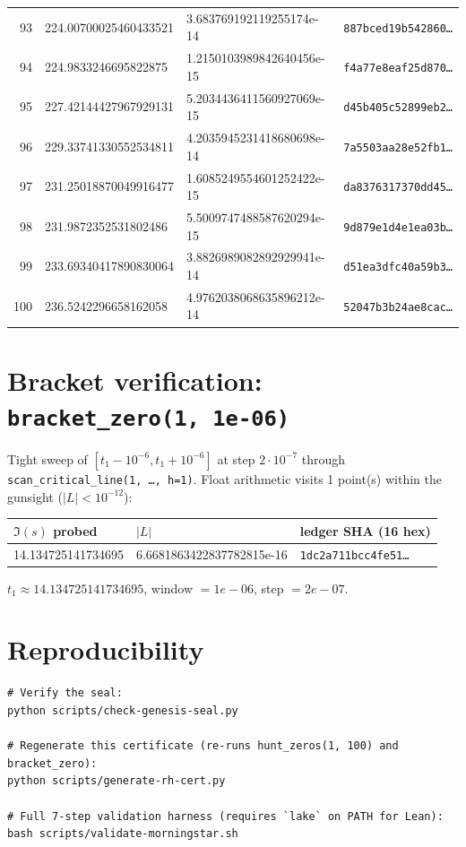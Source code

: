 \documentclass[11pt]{article}
\begin{document}
\begin{center}
\begin{longtable}{rlll}
93 & 224.00700025460433521 & 3.683769192119255174e-14 & \texttt{887bced19b542860\dots} \\
94 & 224.9833246695822875 & 1.2150103989842640456e-15 & \texttt{f4a77e8eaf25d870\dots} \\
95 & 227.42144427967929131 & 5.2034436411560927069e-15 & \texttt{d45b405c52899eb2\dots} \\
96 & 229.33741330552534811 & 4.2035945231418680698e-14 & \texttt{7a5503aa28e52fb1\dots} \\
97 & 231.25018870049916477 & 1.6085249554601252422e-15 & \texttt{da8376317370dd45\dots} \\
98 & 231.9872352531802486 & 5.5009747488587620294e-15 & \texttt{9d879e1d4e1ea03b\dots} \\
99 & 233.69340417890830064 & 3.8826989082892929941e-14 & \texttt{d51ea3dfc40a59b3\dots} \\
100 & 236.5242296658162058 & 4.9762038068635896212e-14 & \texttt{52047b3b24ae8cac\dots} \\
\bottomrule
\end{longtable}
\end{center}

\section*{Bracket verification: \texttt{bracket\_zero(1, 1e-06)}}
Tight sweep of $[t_1 - 10^{-6}, t_1 + 10^{-6}]$ at step $2\cdot 10^{-7}$
through \texttt{scan\_critical\_line(1, \dots, h=1)}. Float arithmetic
visits 1 point(s) within the gunsight
($|L|<10^{-12}$):
\begin{center}
\begin{tabular}{lll}
\toprule
$\Im(s)$ probed & $|L|$ & ledger SHA (16 hex) \\
\midrule
14.134725141734695 & 6.6681863422837782815e-16 & \texttt{1dc2a711bcc4fe51\dots} \\
\bottomrule
\end{tabular}
\end{center}
\noindent
$t_1 \approx 14.134725141734695$, window $= 1e-06$,
step $= 2e-07$.

\section*{Reproducibility}
\begin{lstlisting}
# Verify the seal:
python scripts/check-genesis-seal.py

# Regenerate this certificate (re-runs hunt_zeros(1, 100) and bracket_zero):
python scripts/generate-rh-cert.py

# Full 7-step validation harness (requires `lake` on PATH for Lean):
bash scripts/validate-morningstar.sh
\end{lstlisting}
\end{document}
